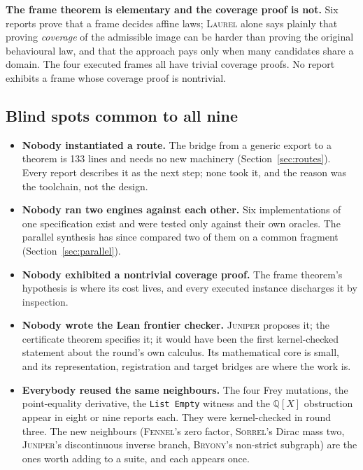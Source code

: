 \documentclass[11pt,a4paper]{article}
\newcommand{\code}[1]{\nolinkurl{#1}}
\newcommand{\Br}{\textsc{Bryony}}
\newcommand{\Fe}{\textsc{Fennel}}
\newcommand{\Ju}{\textsc{Juniper}}
\newcommand{\La}{\textsc{Laurel}}
\newcommand{\So}{\textsc{Sorrel}}
\newcommand{\Q}{\mathbb Q}
\theoremstyle{definition}
\theoremstyle{plain}
\begin{document}
\textbf{The frame theorem is elementary and the coverage proof is not.} Six reports prove that a frame decides affine laws; \La{} alone says plainly that proving \emph{coverage} of the admissible image can be harder than proving the original behavioural law, and that the approach pays only when many candidates share a domain. The four executed frames all have trivial coverage proofs. No report exhibits a frame whose coverage proof is nontrivial.

\subsection{Blind spots common to all nine}
\begin{itemize}
\item \textbf{Nobody instantiated a route.} The bridge from a generic export to a theorem is 133 lines and needs no new machinery (Section~\ref{sec:routes}). Every report describes it as the next step; none took it, and the reason was the toolchain, not the design.
\item \textbf{Nobody ran two engines against each other.} Six implementations of one specification exist and were tested only against their own oracles. The parallel synthesis has since compared two of them on a common fragment (Section~\ref{sec:parallel}).
\item \textbf{Nobody exhibited a nontrivial coverage proof.} The frame theorem's hypothesis is where its cost lives, and every executed instance discharges it by inspection.
\item \textbf{Nobody wrote the Lean frontier checker.} \Ju{} proposes it; the certificate theorem specifies it; it would have been the first kernel-checked statement about the round's own calculus. Its mathematical core is small, and its representation, registration and target bridges are where the work is.
\item \textbf{Everybody reused the same neighbours.} The four Frey mutations, the point-equality derivative, the \code{List Empty} witness and the $\Q[X]$ obstruction appear in eight or nine reports each. They were kernel-checked in round three. The new neighbours (\Fe's zero factor, \So's Dirac mass two, \Ju's discontinuous inverse branch, \Br's non-strict subgraph) are the ones worth adding to a suite, and each appears once.
\end{itemize}
\end{document}

